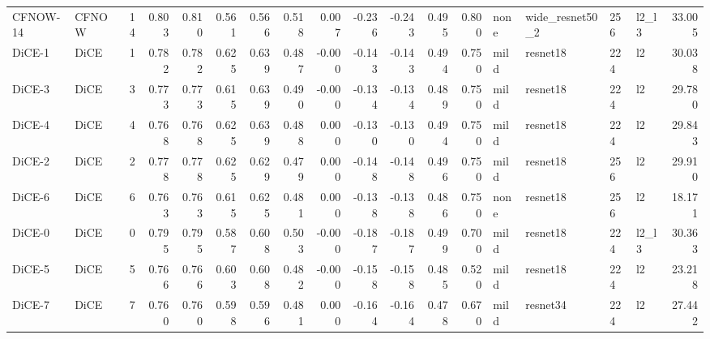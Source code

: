 \begin{tabular}{llrrrrrrrrrrrllllr}
 CFNOW-14 &  CFNOW &     14 &            0.803 &         0.810 &        0.561 &                   0.566 &       0.518 &               0.007 &         -0.236 &            -0.243 &          0.495 &              0.800 &       none & wide\_resnet50\_2 &        256 &  l2\_l3 &       33.005 \\
   DiCE-1 &   DiCE &      1 &            0.782 &         0.782 &        0.625 &                   0.639 &       0.487 &              -0.000 &         -0.143 &            -0.143 &          0.494 &              0.750 &       mild &        resnet18 &        224 &     l2 &       30.038 \\
   DiCE-3 &   DiCE &      3 &            0.773 &         0.773 &        0.615 &                   0.639 &       0.490 &              -0.000 &         -0.134 &            -0.134 &          0.489 &              0.750 &       mild &        resnet18 &        224 &     l2 &       29.780 \\
   DiCE-4 &   DiCE &      4 &            0.768 &         0.768 &        0.625 &                   0.639 &       0.488 &               0.000 &         -0.130 &            -0.130 &          0.494 &              0.750 &       mild &        resnet18 &        224 &     l2 &       29.843 \\
   DiCE-2 &   DiCE &      2 &            0.778 &         0.778 &        0.625 &                   0.629 &       0.479 &               0.000 &         -0.148 &            -0.148 &          0.496 &              0.750 &       mild &        resnet18 &        256 &     l2 &       29.910 \\
   DiCE-6 &   DiCE &      6 &            0.763 &         0.763 &        0.615 &                   0.625 &       0.481 &               0.000 &         -0.138 &            -0.138 &          0.486 &              0.750 &       none &        resnet18 &        256 &     l2 &       18.171 \\
   DiCE-0 &   DiCE &      0 &            0.795 &         0.795 &        0.587 &                   0.608 &       0.503 &              -0.000 &         -0.187 &            -0.187 &          0.499 &              0.700 &       mild &        resnet18 &        224 &  l2\_l3 &       30.363 \\
   DiCE-5 &   DiCE &      5 &            0.766 &         0.766 &        0.603 &                   0.608 &       0.482 &              -0.000 &         -0.158 &            -0.158 &          0.485 &              0.520 &       mild &        resnet18 &        224 &     l2 &       23.218 \\
   DiCE-7 &   DiCE &      7 &            0.760 &         0.760 &        0.598 &                   0.596 &       0.481 &               0.000 &         -0.164 &            -0.164 &          0.478 &              0.670 &       mild &        resnet34 &        224 &     l2 &       27.442 \\
\bottomrule
\end{tabular}
